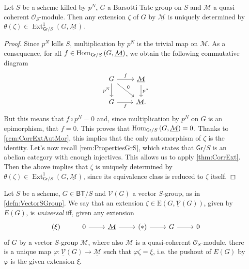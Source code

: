 \begin{lem}\label{lem:rigidityExt}
	Let $S$ be a scheme killed by $p^N$, $G$ a Barsotti-Tate group on $S$
	and $\mathcal{M}$ a quasi-coherent $\mathcal{O}_S$-module.
	Then any extension $\zeta$ of $G$ by $\underline{\mathcal{M}}$ is
	uniquely determined by $\theta(\zeta) \in 
	\operatorname{Ext}^1_{\mathsf{Gr}/S}(G, \underline{\mathcal{M}})$.
\end{lem} 
\begin{proof}
	Since $p^N$ kills $S$, multiplication by $p^N$ 
	is the trivial map on $\mathcal{M}$.
	As a consequence, for all $f \in \operatorname{Hom}_{\mathsf{Gr}/S}
	\left( G, \underline{\mathcal{M}} \right)$,
	we obtain the following commutative diagram
	\begin{equation*}
	\begin{tikzcd}
		G \arrow[r, "f", rightarrow] 
		\arrow[d, "p^N"', rightarrow] 
		\arrow[rd, "0", rightarrow] &
		\underline{\mathcal{M}} \arrow[d, "p^n", rightarrow] \\
		G \arrow[r, "f"', rightarrow] &
		\underline{\mathcal{M}}
	.\end{tikzcd}
	\end{equation*}
	But this means that $f \circ p^N = 0$ and, since multiplication
	by $p^N$ on $G$ is an epimorphism, that $f = 0$.
	This proves that $\operatorname{Hom}_{ \mathsf{Gr}/S } \left( G, \underline{\mathcal{M}} \right) = 0$.
	Thanks to \cref{rem:CorrExtAutMor}, this implies that
	the only automorphism of $\zeta$ is the identity.
	Let's now recall \cref{rem:PropertiesGrS},
	which states that $\mathsf{Gr}/S$ is an abelian category with enough injectives.
	This allows us to apply \cref{thm:CorrExt}.
	Then the above implies that $\zeta$ is uniquely determined by $\theta(\zeta)
	\in \operatorname{Ext}^1_{\mathsf{Gr}/S}(G, \underline{\mathcal{M}})$,
	since its equivalence class is reduced to $\zeta$ itself.
\end{proof}


\begin{defn}
	Let $S$ be a scheme, $G \in \mathsf{BT}/S$
	and $\underline{\mathcal{V}}(G)$ a vector $S$-group,
	as in \cref{defn:VectorSGroup}.
	We say that an extension $\zeta \in \mathrm{E}(G, \underline{\mathcal{V}}(G))$, given
	by $E(G)$, is \emph{universal} iff, given any extension
	\begin{equation*}
	\begin{tikzcd}
		(\xi) &
		0 \arrow[r, "", rightarrow] &
		\underline{\mathcal{M}} \arrow[r, "", rightarrow] &
		(*) \arrow[r, "", rightarrow] &
		G \arrow[r, "", rightarrow] &
		0
	\end{tikzcd}
	\end{equation*}
	of $G$ by a vector $S$-group $\underline{\mathcal{M}}$,
	where also $\mathcal{M}$ is a quasi-coherent $\mathcal{O}_{ S }$-module,
	there is a unique map $\varphi\colon \underline{\mathcal{V}}(G) \to \underline{\mathcal{M}}$
	such that $\varphi\zeta = \xi$, i.e. the pushout of
	$E(G)$ by $\varphi$ is the given extension $\xi$.
\end{defn}


